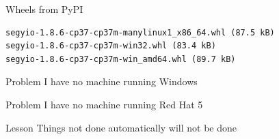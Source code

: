 \documentclass[pdf]{beamer}
\begin{document}
\begin{frame}[fragile]{Wheels from PyPI}
    \begin{verbatim}
segyio-1.8.6-cp37-cp37m-manylinux1_x86_64.whl (87.5 kB)
segyio-1.8.6-cp37-cp37m-win32.whl (83.4 kB)
segyio-1.8.6-cp37-cp37m-win_amd64.whl (89.7 kB)
    \end{verbatim}

\end{frame}

\begin{frame}
    \begin{block}{Problem}
        I have no machine running Windows
    \end{block}
\end{frame}

\begin{frame}
    \begin{block}{Problem}
        I have no machine running Red Hat 5
    \end{block}
\end{frame}

\begin{frame}
    \begin{block}{Lesson}
        Things not done automatically will not be done
    \end{block}

\end{frame}
\end{document}
